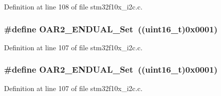 Definition at line 108 of file stm32f10x\+\_\+i2c.\+c.

\subsubsection[{\texorpdfstring{O\+A\+R2\+\_\+\+E\+N\+D\+U\+A\+L\+\_\+\+Set}{OAR2_ENDUAL_Set}}]{\setlength{\rightskip}{0pt plus 5cm}\#define O\+A\+R2\+\_\+\+E\+N\+D\+U\+A\+L\+\_\+\+Set~(({\bf uint16\+\_\+t})0x0001)}\hypertarget{group___i2_c___private___defines_ga859551657f688e5efdb3f573e78ee979}{}\label{group___i2_c___private___defines_ga859551657f688e5efdb3f573e78ee979}


Definition at line 107 of file stm32f10x\+\_\+i2c.\+c.

\subsubsection[{\texorpdfstring{O\+A\+R2\+\_\+\+E\+N\+D\+U\+A\+L\+\_\+\+Set}{OAR2_ENDUAL_Set}}]{\setlength{\rightskip}{0pt plus 5cm}\#define O\+A\+R2\+\_\+\+E\+N\+D\+U\+A\+L\+\_\+\+Set~(({\bf uint16\+\_\+t})0x0001)}\hypertarget{group___i2_c___private___defines_ga859551657f688e5efdb3f573e78ee979}{}\label{group___i2_c___private___defines_ga859551657f688e5efdb3f573e78ee979}


Definition at line 107 of file stm32f10x\+\_\+i2c.\+c.

